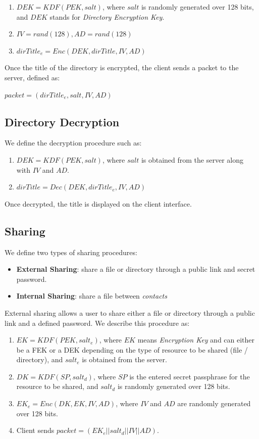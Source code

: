 \documentclass[a4paper,9pt,twoside]{article}
\begin{document}
\begin{enumerate}
\itemsep0em
\item $DEK=KDF(PEK, salt)$, where $salt$ is randomly generated over 128 bits, and 
$DEK$ stands for \emph{Directory Encryption Key}.
\item $IV=rand(128), AD=rand(128)$
\item $dirTitle_e=Enc(DEK, dirTitle, IV, AD)$
\end{enumerate}

Once the title of the directory is encrypted, the client sends a packet to the server, defined as: 

\begin{center}
$packet=(dirTitle_e, salt, IV, AD)$
\end{center}

\subsection{Directory Decryption}

We define the decryption procedure such as:

\begin{enumerate}
\itemsep0em
\item $DEK=KDF(PEK, salt)$, where $salt$ is obtained from the server along with $IV$ and $AD$.
\item $dirTitle=Dec(DEK, dirTitle_e, IV, AD)$
\end{enumerate}

Once decrypted, the title is displayed on the client interface.

\subsection{Sharing}

We define two types of sharing procedures:

\begin{itemize}
\itemsep0em
\item \textbf{External Sharing}: share a file or directory through a public link and secret password.
\item \textbf{Internal Sharing}: share a file between \emph{contacts}
\end{itemize}

External sharing allows a user to share either a file or directory through a public link 
and a defined password. We describe this procedure as:

\begin{enumerate}
\itemsep0em
\item $EK=KDF(PEK, salt_e)$, where $EK$ means \emph{Encryption Key} 
and can either be a FEK or a DEK depending on the type of resource 
to be shared (file / directory), and $salt_e$ is obtained from the server.
\item $DK=KDF(SP, salt_d)$, where $SP$ is the entered secret passphrase for the 
resource to be shared, and $salt_d$ is randomly generated over 128 bits.
\item $EK_e=Enc(DK, EK, IV, AD)$, where $IV$ and $AD$ are randomly generated 
over 128 bits.
\item Client sends $packet=(EK_e || salt_d || IV || AD)$.
\end{enumerate}
\end{document}
